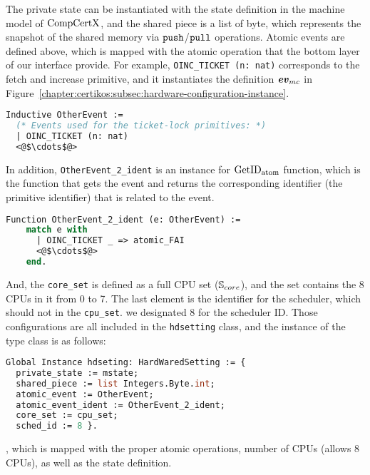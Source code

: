 The private state can be instantiated with 
the state definition in the machine model of $\mathrm{CompCertX}$,
and the shared piece is a list of byte, which represents 
the snapshot of the shared memory via ${\mathrm{\texttt{push}}}$/${\mathrm{\texttt{pull}}}$ operations. 
Atomic events are defined above, 
which is mapped with the atomic operation that the bottom layer of our interface provide.
For example, \lstinline$OINC_TICKET (n: nat)$ corresponds to the fetch and increase primitive,
and it instantiates the definition ${\mathrm{\textbf{\textit{ev}}}_{mc}}$ in Figure~\ref{chapter:certikos:subsec:hardware-configuration-instance}.
\begin{lstlisting}[language=Caml]
  Inductive OtherEvent :=
  (* Events used for the ticket-lock primitives: *)
  | OINC_TICKET (n: nat)
  <@$\cdots$@>
\end{lstlisting}
In addition, \lstinline$OtherEvent_2_ident$ is an instance for ${\mathrm{GetID}_{\mathrm{atom}}}$ function, which is the function
that gets the event and returns the corresponding identifier (the primitive identifier) that is related to the event.
\begin{lstlisting}[language=Caml]
  Function OtherEvent_2_ident (e: OtherEvent) :=
    match e with
      | OINC_TICKET _ => atomic_FAI
      <@$\cdots$@>
    end.
\end{lstlisting}
And, the \lstinline$core_set$ is defined as a full CPU set (${\mathbb{S}_{core}}$), and 
the set contains the 8 CPUs in it from 0 to 7.
The last element is the identifier for 
the scheduler, which should not in the \lstinline$cpu_set$. 
we designated 8 for the scheduler ID.
Those configurations are all included in the 
\lstinline$hdsetting$ class, and the instance of the type class
is as follows:
\begin{lstlisting}[language=Caml]
Global Instance hdseting: HardWaredSetting := {
  private_state := mstate;
  shared_piece := list Integers.Byte.int;
  atomic_event := OtherEvent;
  atomic_event_ident := OtherEvent_2_ident;
  core_set := cpu_set;
  sched_id := 8 }.
\end{lstlisting}
, which is mapped with 
the proper atomic operations, number of CPUs (allows 8 CPUs), 
as well as the state definition. 


